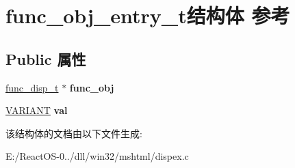 \hypertarget{structfunc__obj__entry__t}{}\section{func\+\_\+obj\+\_\+entry\+\_\+t结构体 参考}
\label{structfunc__obj__entry__t}
\subsection*{Public 属性}
\begin{DoxyCompactItemize}
\item 
\mbox{\label{structfunc__obj__entry__t_aa5b85c029b42b46d62dd9919e18d1dba}} 
\hyperlink{structfunc__disp__t}{func\+\_\+disp\+\_\+t} $\ast$ {\bfseries func\+\_\+obj}
\item 
\mbox{\label{structfunc__obj__entry__t_aa3a4879b488c4d395e4765400ebe5677}} 
\hyperlink{structtag_v_a_r_i_a_n_t}{V\+A\+R\+I\+A\+NT} {\bfseries val}
\end{DoxyCompactItemize}


该结构体的文档由以下文件生成\+:\begin{DoxyCompactItemize}
\item 
E\+:/\+React\+O\+S-\/0../dll/win32/mshtml/dispex.\+c\end{DoxyCompactItemize}
